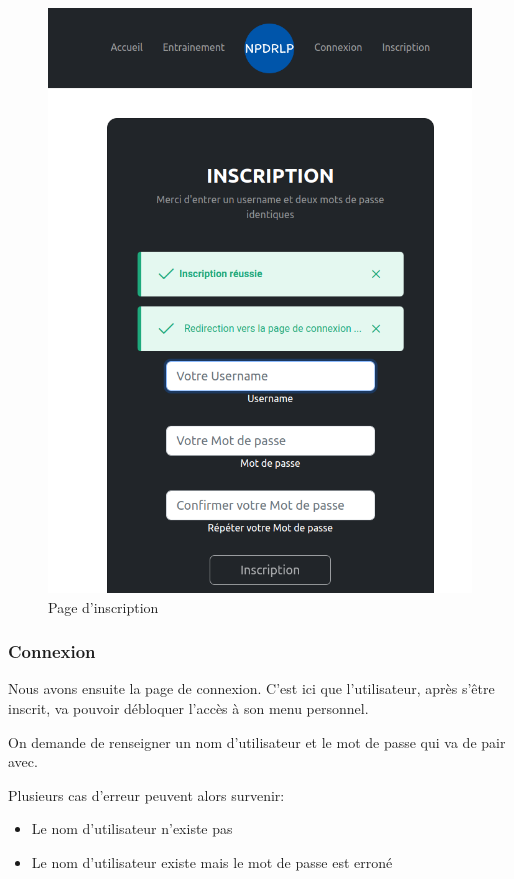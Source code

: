 \documentclass[12pt,french]{article}
\begin{document}
\begin{figure}[H]
\begin{minipage}{.5\textwidth}
		\includegraphics[scale=0.25]{inscri2.png}
	\end{minipage}
	\caption{Page d'inscription}
\end{figure}

\subsubsection{Connexion}

Nous avons ensuite la page de connexion. C'est ici que l'utilisateur, après s'être inscrit, va pouvoir débloquer l'accès à son menu personnel.

On demande de renseigner un nom d'utilisateur et le mot de passe qui va de pair avec.

Plusieurs cas d'erreur peuvent alors survenir:

\begin{itemize}
	\item Le nom d'utilisateur n'existe pas
	\item Le nom d'utilisateur existe mais le mot de passe est erroné
\end{itemize}
\end{document}
